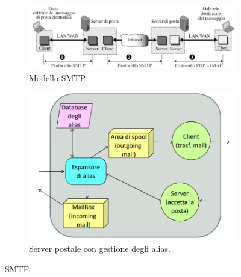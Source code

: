 \documentclass[11pt, italian, openany]{book}
\begin{document}
\begin{sloppypar}
\begin{figure}[!h]
	\begin{subfigure}[t]{0.49 \linewidth} \centering
		\includegraphics[scale=0.28]{images/smtp.png}
		\caption{Modello SMTP.}
	\end{subfigure}
	\begin{subfigure}[t]{0.49 \linewidth} \centering
		\includegraphics[scale=0.2]{images/smtp-aliasing.png}
		\caption{Server postale con gestione degli alias.}
	\end{subfigure}
	\caption{SMTP.}
	\label{fig:smtp}
\end{figure}


\end{sloppypar}
\end{document}
